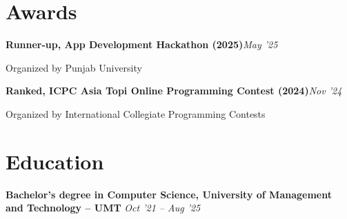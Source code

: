\documentclass[10pt, letterpaper]{article}
\newcommand{\awardrow}[3]{%
\noindent\textbf{#1}\hfill{\small\color{lightgray}\textit{#3}}\par
{\small\color{lightgray}#2}\par\vspace{4pt}}
\begin{document}
\section{Awards}

\awardrow{Runner-up, App Development Hackathon (2025)}{Organized by Punjab University}{May '25}
\awardrow{Ranked, ICPC Asia Topi Online Programming Contest (2024)}{Organized by International Collegiate Programming Contests}{Nov '24}

\section{Education}

\noindent\textbf{Bachelor's degree in Computer Science, University of Management and Technology -- UMT}
\hfill{\small\color{lightgray}\textit{Oct '21 -- Aug '25}}
\end{document}
